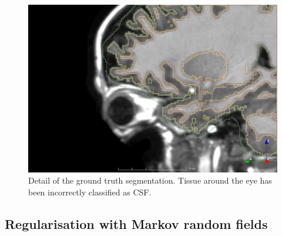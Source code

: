 \begin{figure}
  \centering
  \includegraphics[width=\textwidth]{figures/priors_manual_wrong}
  \caption{Detail of the ground truth segmentation. Tissue around the eye has been incorrectly classified as CSF.}
  \label{fig:manual-wrong}
\end{figure}


%
%



\subsection{Regularisation with Markov random fields}


